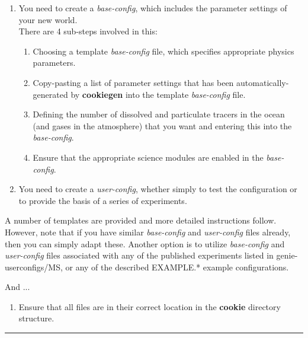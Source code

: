 \begin{enumerate}[noitemsep]
\vspace{1mm}
\item You need to create a \textit{base-config}, which includes the parameter settings of your new world.
\\There are 4 sub-steps involved in this:
\vspace{1mm}
\begin{enumerate}[noitemsep]
\item Choosing a template \textit{base-config} file, which specifies appropriate physics parameters.
\item Copy-pasting a list of parameter settings that has been automatically-generated by \textbf{cookiegen} into the template\textit{ base-config} file.
\item Defining the number of dissolved and particulate tracers in the ocean (and gases in the atmosphere) that you want and entering this into the \textit{base-config}.
\item Ensure that the appropriate science modules are enabled in the \textit{base-config}.
\end{enumerate}
\vspace{1mm}
\item You need to create a \textit{user-config}, whether simply to test the configuration or to provide the basis of a series of experiments.
\end{enumerate}
\vspace{1mm}

A number of templates are provided and more detailed instructions follow. However, note that if you have similar \textit{base-config} and \textit{user-config} files already, then you can simply adapt these. Another option is to utilize \textit{base-config} and \textit{user-config} files associated with any of the published experiments listed in \textsf{\footnotesize genie-userconfigs/MS}, or any of the described \textsf{\footnotesize EXAMPLE.*} example configurations.

\vspace{1mm}
And ...
\begin{enumerate}[noitemsep]
\vspace{1mm}
\setcounter{enumi}{2}
\item Ensure that all files are in their correct location in the \textbf{cookie} directory structure.
\end{enumerate}
\vspace{1mm}

\vspace{1mm}\noindent\rule{4cm}{0.5pt}\vspace{2mm}

